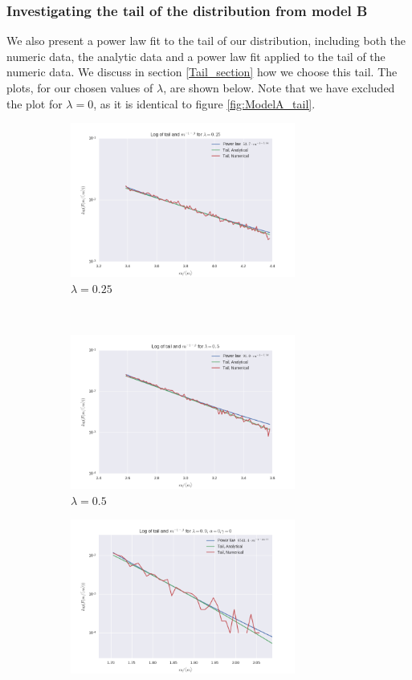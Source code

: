 \documentclass[a4paper, 10pt]{article}
\begin{document}
\subsubsection{Investigating the tail of the distribution from model B}
We also present a power law fit to the tail of our distribution, including both the numeric data, the analytic data and a power law fit applied to the tail of the numeric data. We discuss in section \ref{Tail_section} how we choose this tail. The plots, for our chosen values of $\lambda$, are shown below. Note that we have excluded the plot for $\lambda = 0$, as it is identical to figure \ref{fig:ModelA_tail}.
\begin{figure}[!ht] %
    \centering
    \begin{subfigure}[H!]{0.5\textwidth}
        \centering
        \includegraphics[height=2.0in]{tailPowerlamb025.png} %
        \caption{$\lambda = 0.25$}\label{fig:ModelB_tail_lamb_025}
    \end{subfigure}%
    ~ 
    \begin{subfigure}[H!]{0.5\textwidth}
        \centering
        \includegraphics[height=2.0in]{tailPowerlamb05.png}
        \caption{$\lambda = 0.5$}\label{fig:ModelB_tail_lamb_05}
    \end{subfigure}
    \begin{subfigure}[H!]{0.5\textwidth}
        \centering
        \includegraphics[height=2.0in]{tailL09A0G0_v2.png}

\end{subfigure}
\end{figure}
\end{document}
